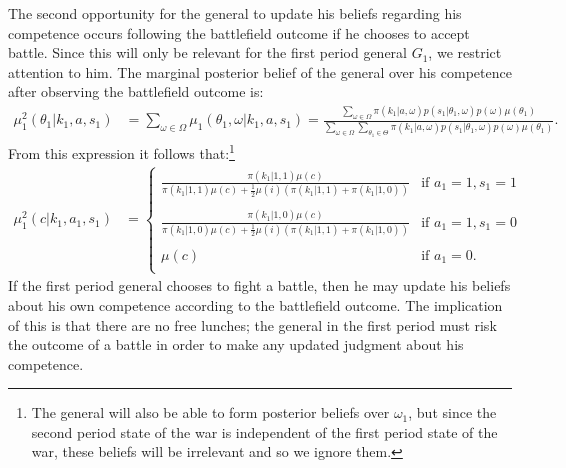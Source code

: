 \documentclass[11pt,]{article}
\begin{document}
The second opportunity for the general to update his beliefs regarding his competence occurs following the battlefield outcome if he chooses to accept battle.  Since this will only be relevant for the first period general $G_1$, we restrict attention to him.  The marginal posterior belief of the general over his competence after observing the battlefield outcome is:
\begin{align*}
\nonumber\mu^2_{1}(\theta_{1}|k_1,a,s_1)&=\sum_{\omega\in\Omega}\mu_{1}(\theta_{1},\omega|k_1,a,s_1)=\frac{\sum_{\omega\in\Omega}\pi(k_1|a,\omega)p(s_1| \theta_{1},\omega)p(\omega)\mu(\theta_{1})}{\sum_{\omega\in\Omega}\sum_{\theta_{1}\in\Theta}\pi(k_1|a,\omega)p(s_1|\theta_{1},\omega)p(\omega)\mu(\theta_{1})}.
\end{align*}From this expression it follows that:\footnote{\normalsize\doublespacing The general will also be able to form posterior beliefs over $\omega_1$, but since the second period state of the war is independent of the first period state of the war, these beliefs will be irrelevant and so we ignore them.}
\begin{align}
\mu^2_{1}(c|k_1,a_1,s_1)&=\left\{\begin{array}{ll}
\frac{\pi(k_1|1,1)\mu(c)}{\pi(k_1|1,1)\mu(c)+\frac{1}{2}\mu(i)(\pi(k_1|1,1)+\pi(k_1|1,0))}&\mbox{if }a_1=1, s_1=1\\
&\\
\frac{\pi(k_1|1,0)\mu(c)}{\pi(k_1|1,0)\mu(c)+\frac{1}{2}\mu(i)(\pi(k_1|1,1)+\pi(k_1|1,0))}&\mbox{if }a_1=1, s_1=0\\
&\\
\mu(c)&\mbox{if }a_1=0.\\
\end{array}\right.
\end{align}If the first period general chooses to fight a battle, then he may update his beliefs about his own competence according to the battlefield outcome.  The implication of this is that there are no free lunches; the general in the first period must risk the outcome of a battle in order to make any updated judgment about his competence.  
\end{document}
